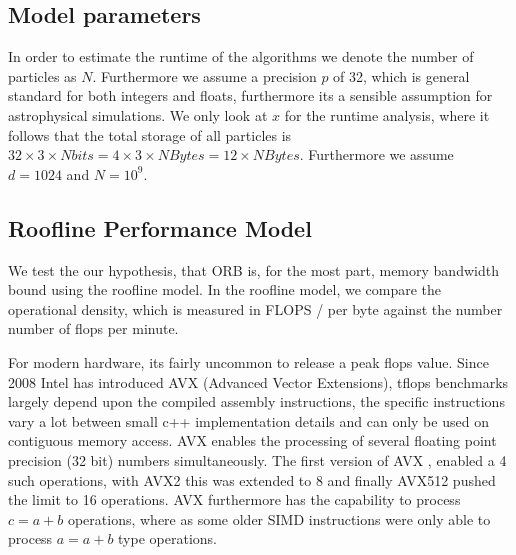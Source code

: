 \documentclass[]{article}
\begin{document}
\subsection{Model parameters}

\begin{comment}
If we investigate the operations which are needed for the binary cut algorithm, we notice that the actual operations completed inside the loop, are only very few. When comparing the CPU implementation with GPU one, we need to not only consider benefits from increased parallelism in GPU hardware, which will lead to a higher tflops, but also possible speed-ups reached by higher bandwidths in GPU memory than CPU memory. On the other hand we need to mitigate the very low bandwidths between the GPU and CPU, which cannot be avoided altogether, as the data needs to be sent from the CPU to GPU before we can process it on the graphics processor.
\end{comment}

In order to estimate the runtime of the algorithms we denote the number of particles as $N$. Furthermore we assume a precision $p$ of 32, which is general standard for both integers and floats, furthermore its a sensible assumption for astrophysical simulations. We only look at $x$ for the runtime analysis, where it follows that the total storage of all particles is $32 \times 3 \times N bits = 4 \times 3 \times N Bytes = 12 \times N Bytes$. Furthermore we assume $d = 1024$ and $N=10^9$.


\subsection{Roofline Performance Model}

We test the our hypothesis, that ORB is, for the most part, memory bandwidth bound using the roofline model. In the roofline model, we compare the operational density, which is measured in FLOPS / per byte against the number number of flops per minute. 

For modern hardware, its fairly uncommon to release a peak flops value. Since 2008 Intel has introduced AVX (Advanced Vector Extensions), tflops benchmarks largely depend upon the compiled assembly instructions, the specific instructions vary a lot between small c++ implementation details and can only be used on contiguous memory access. AVX enables the processing of several floating point precision (32 bit) numbers simultaneously. The first version of AVX , enabled a 4 such operations, with AVX2 this was extended to 8 and finally AVX512 pushed the limit to 16 operations. AVX furthermore has the capability to process $c = a + b$ operations, where as some older SIMD instructions were only able to process $a = a + b$ type operations. 
\end{document}
